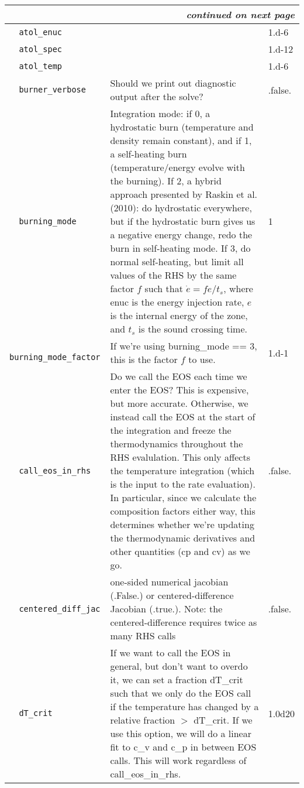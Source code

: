 \begin{landscape}
{\begin{center}
\begin{longtable}{|l|p{5.25in}|l|}
\multicolumn{3}{|r|}{{\em continued on next page}} \\ \hline
\endfoot

\hline 
\endlastfoot


\rowcolor{tableShade}
\verb=  atol_enuc  = &    &  1.d-6 \\
\verb=  atol_spec  = &    &  1.d-12 \\
\rowcolor{tableShade}
\verb=  atol_temp  = &    &  1.d-6 \\
\verb=  burner_verbose  = &   Should we print out diagnostic output after the solve?  &  .false. \\
\rowcolor{tableShade}
\verb=  burning_mode  = &   Integration mode: if 0, a hydrostatic burn (temperature and density remain constant), and if 1, a self-heating burn (temperature/energy evolve with the burning). If 2, a hybrid approach presented by Raskin et al. (2010): do hydrostatic everywhere, but if the hydrostatic burn gives us a negative energy change, redo the burn in self-heating mode. If 3, do normal self-heating, but limit all values of the RHS by the same factor $f$ such that $\dot{e} = fe / t_s$, where enuc is the energy injection rate, $e$ is the internal energy of the zone, and $t_s$ is the sound crossing time.  &  1 \\
\verb=  burning_mode_factor  = &   If we're using burning\_mode == 3, this is the factor $f$ to use.  &  1.d-1 \\
\rowcolor{tableShade}
\verb=  call_eos_in_rhs  = &   Do we call the EOS each time we enter the EOS?  This is expensive, but more accurate.  Otherwise, we instead call the EOS at the start of the integration and freeze the thermodynamics throughout the RHS evalulation.  This only affects the temperature integration (which is the input to the rate evaluation). In particular, since we calculate the composition factors either way, this determines whether we're updating the thermodynamic derivatives and other quantities (cp and cv) as we go.  &  .false. \\
\verb=  centered_diff_jac  = &   one-sided numerical jacobian (.False.) or centered-difference Jacobian (.true.).  Note: the centered-difference requires twice as many RHS calls  &  .false. \\
\rowcolor{tableShade}
\verb=  dT_crit  = &   If we want to call the EOS in general, but don't want to overdo it, we can set a fraction dT\_crit such that we only do the EOS call if the temperature has changed by a relative fraction $>$ dT\_crit. If we use this option, we will do a linear fit to c\_v and c\_p in between EOS calls. This will work regardless of call\_eos\_in\_rhs.  &  1.0d20 \\

\end{longtable}
\end{center}}
\end{landscape}

